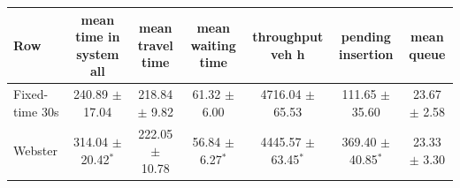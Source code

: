 \begin{tabular}{lcccccc}
\toprule
Row & mean time in system all & mean travel time & mean waiting time & throughput veh h & pending insertion & mean queue \\
\midrule
Fixed-time 30s & 240.89 $\pm$ 17.04 & 218.84 $\pm$ 9.82 & 61.32 $\pm$ 6.00 & 4716.04 $\pm$ 65.53 & 111.65 $\pm$ 35.60 & 23.67 $\pm$ 2.58 \\
Webster & 314.04 $\pm$ 20.42$^{*}$ & 222.05 $\pm$ 10.78 & 56.84 $\pm$ 6.27$^{*}$ & 4445.57 $\pm$ 63.45$^{*}$ & 369.40 $\pm$ 40.85$^{*}$ & 23.33 $\pm$ 3.30 \\
\bottomrule
\end{tabular}
